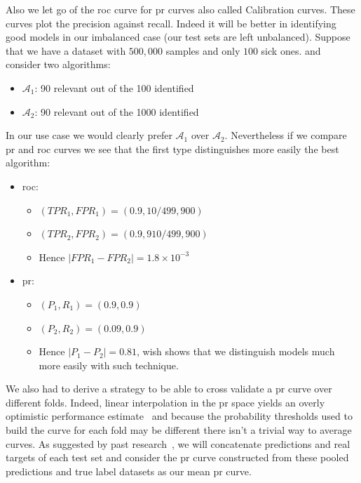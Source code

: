 Also we let go of the \acrshort{roc} curve for \acrfull{pr} curves also called Calibration curves. These curves plot the precision against recall. Indeed it will be better in identifying good models in our imbalanced case (our test sets are left unbalanced). Suppose that we have a dataset with $500,000$ samples and only $100$ sick ones. and consider two algorithms:
\begin{itemize}[noitemsep,topsep=0pt]
	\item $\mathcal{A}_1$: 90 relevant out of the 100 identified
	\item $\mathcal{A}_2$: 90 relevant out of the 1000 identified
\end{itemize}
In our use case we would clearly prefer $\mathcal{A}_1$ over $\mathcal{A}_2$. Nevertheless if we compare \acrshort{pr} and \acrshort{roc} curves we see that the first type distinguishes more easily the best algorithm:
\begin{itemize}
	\item \acrshort{roc}: 
		\begin{itemize}[noitemsep,topsep=0pt]
		\item $({TPR}_1,{FPR}_1)=(0.9,10/499,900)$
		\item $({TPR}_2,{FPR}_2)=(0.9,910/499,900)$
		\item Hence $|{FPR}_1-{FPR}_2|= 1.8\times 10^{-3}$
		\end{itemize}
	\item \acrshort{pr}: 
		\begin{itemize}[noitemsep,topsep=0pt]
		\item $({P}_1,{R}_1)=(0.9,0.9)$
		\item $({P}_2,{R}_2)=(0.09,0.9)$
		\item Hence $|{P}_1-{P}_2|= 0.81$, wish shows that we distinguish models much more easily with such technique.
		\end{itemize}
\end{itemize}

We also had to derive a strategy to be able to cross validate a \acrshort{pr} curve over different folds. Indeed, linear interpolation in the \acrshort{pr} space yields an overly optimistic performance estimate~\cite{PRcurve} and because the probability thresholds used to build the curve for each fold may be different there isn't a trivial way to average curves. As suggested by past research~\cite{apples}, we will concatenate predictions and real targets of each test set and consider the \acrshort{pr} curve constructed from these pooled predictions and true label datasets as our mean \acrshort{pr} curve.

